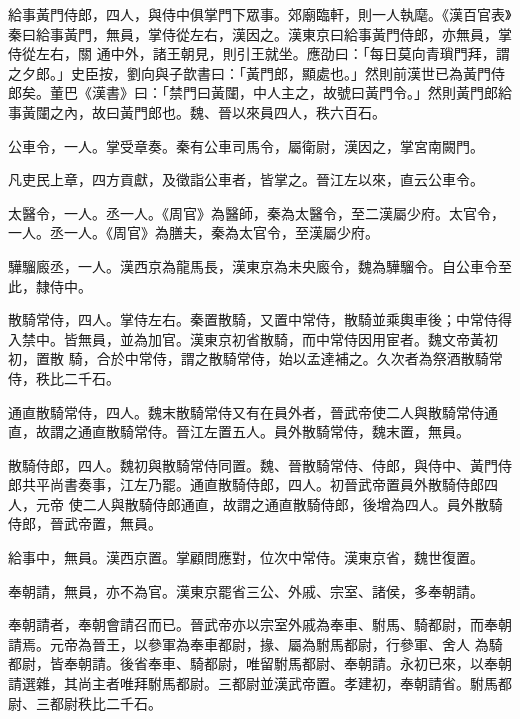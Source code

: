 
\begin{pinyinscope}

 給事黃門侍郎，四人，與侍中俱掌門下眾事。郊廟臨軒，則一人執麾。《漢百官表》秦曰給事黃門，無員，掌侍從左右，漢因之。漢東京曰給事黃門侍郎，亦無員，掌侍從左右，關
 通中外，諸王朝見，則引王就坐。應劭曰：「每日莫向青瑣門拜，謂之夕郎。」史臣按，劉向與子歆書曰：「黃門郎，顯處也。」然則前漢世已為黃門侍郎矣。董巴《漢書》曰：「禁門曰黃闥，中人主之，故號曰黃門令。」然則黃門郎給事黃闥之內，故曰黃門郎也。魏、晉以來員四人，秩六百石。



 公車令，一人。掌受章奏。秦有公車司馬令，屬衛尉，漢因之，掌宮南闕門。



 凡吏民上章，四方貢獻，及徵詣公車者，皆掌之。晉江左以來，直云公車令。



 太醫令，一人。丞一人。《周官》為醫師，秦為太醫令，至二漢屬少府。太官令，一人。丞一人。《周官》為膳夫，秦為太官令，至漢屬少府。



 驊騮廄丞，一人。漢西京為龍馬長，漢東京為未央廄令，魏為驊騮令。自公車令至此，隸侍中。



 散騎常侍，四人。掌侍左右。秦置散騎，又置中常侍，散騎並乘輿車後；中常侍得入禁中。皆無員，並為加官。漢東京初省散騎，而中常侍因用宦者。魏文帝黃初初，置散
 騎，合於中常侍，謂之散騎常侍，始以孟達補之。久次者為祭酒散騎常侍，秩比二千石。



 通直散騎常侍，四人。魏末散騎常侍又有在員外者，晉武帝使二人與散騎常侍通直，故謂之通直散騎常侍。晉江左置五人。員外散騎常侍，魏末置，無員。



 散騎侍郎，四人。魏初與散騎常侍同置。魏、晉散騎常侍、侍郎，與侍中、黃門侍郎共平尚書奏事，江左乃罷。通直散騎侍郎，四人。初晉武帝置員外散騎侍郎四人，元帝
 使二人與散騎侍郎通直，故謂之通直散騎侍郎，後增為四人。員外散騎侍郎，晉武帝置，無員。



 給事中，無員。漢西京置。掌顧問應對，位次中常侍。漢東京省，魏世復置。



 奉朝請，無員，亦不為官。漢東京罷省三公、外戚、宗室、諸侯，多奉朝請。



 奉朝請者，奉朝會請召而已。晉武帝亦以宗室外戚為奉車、駙馬、騎都尉，而奉朝請焉。元帝為晉王，以參軍為奉車都尉，掾、屬為駙馬都尉，行參軍、舍人
 為騎都尉，皆奉朝請。後省奉車、騎都尉，唯留駙馬都尉、奉朝請。永初已來，以奉朝請選雜，其尚主者唯拜駙馬都尉。三都尉並漢武帝置。孝建初，奉朝請省。駙馬都尉、三都尉秩比二千石。




\end{pinyinscope}
